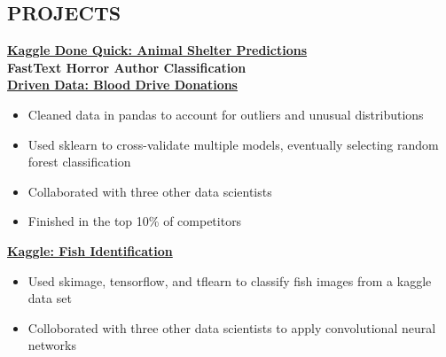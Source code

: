\documentclass[line,margin,10pt]{res}
\begin{document}
\begin{resume}

\section{PROJECTS}
\textbf{\href{http://davisig.org/blog/2016/07/26/KDQ_AnimalShelter}{Kaggle Done Quick: Animal Shelter Predictions}}\\
\textbf{FastText Horror Author Classification}\\
\textbf{\href{https://github.com/davisincubator/digblood}{Driven Data: Blood Drive Donations}}
\begin{itemize}\itemsep -2pt
\item Cleaned data in pandas to account for outliers and unusual distributions
\item Used sklearn to cross-validate multiple models, eventually selecting random forest classification
\item Collaborated with three other data scientists
\item Finished in the top 10\% of competitors
\end{itemize}
\textbf{\href{https://github.com/davisincubator/sashimdig}{Kaggle: Fish Identification}}
\begin{itemize} \itemsep -2pt
\item Used skimage, tensorflow, and tflearn to classify fish images from a kaggle data set
\item Colloborated with three other data scientists to apply convolutional neural networks
\end{itemize}


\end{resume}
\end{document}
